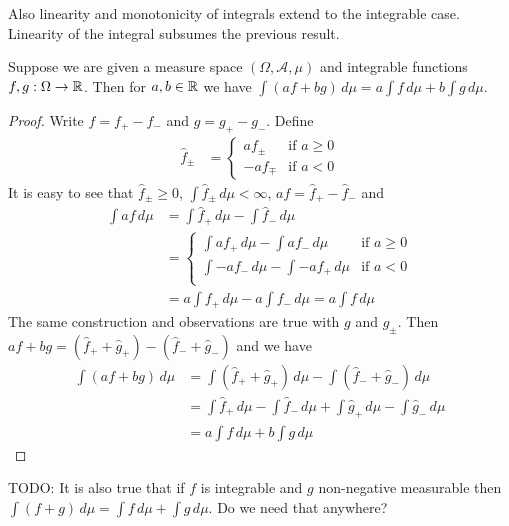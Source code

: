 Also linearity and monotonicity of integrals extend to the integrable
case.  Linearity of the integral subsumes the previous result.
\begin{lem}\label{SignedIntegralLinearity}Suppose we are given a measure space $(\Omega, \mathcal{A},
  \mu)$ and integrable functions $f,g: \Omega \to \mathbb{R}$.  Then for
  $a,b \in \mathbb{R}$ we have $\int (af + bg) \, d\mu = a\int f \, d\mu +
  b\int g \, d\mu$.
\end{lem}
\begin{proof}
Write $f = f_+ - f_-$ and $g = g_+ - g_-$.  Define 
\begin{align*}
\hat{f}_\pm &= \begin{cases}
a f_\pm & \text{if $a  \geq 0$} \\
-a f_\mp & \text{if $a < 0$}
\end{cases}
\end{align*} 
It is easy to see that $\hat{f}_\pm \geq 0$,
$\int \hat{f}_\pm \, d\mu < \infty$,  $a f = \hat{f}_+ - \hat{f}_-$
and
\begin{align*}
\int af \, d\mu &= \int \hat{f}_+ \, d\mu - \int \hat{f}_- \, d\mu\\
&= \begin{cases}
\int a f_+ \, d\mu - \int af_- \, d\mu & \text{if $a \geq 0$} \\
\int -a f_- \, d\mu - \int -af_+ \, d\mu & \text{if $a < 0$} \\
\end{cases}\\
&= a \int f_+ \, d\mu - a \int f_- \, d\mu = a \int f\, d\mu
\end{align*}  
The same construction and
observations are true with $g$ and $\hat{g}_\pm$.
Then $a f + b g = (\hat{f}_+ + \hat{g}_+) - (\hat{f}_- + \hat{g}_-)$
and we have
\begin{align*}
\int (a f + b g) \, d\mu &= \int (\hat{f}_+ + \hat{g}_+) \, d\mu -
\int (\hat{f}_- + \hat{g}_-) \, d\mu \\
&= \int \hat{f}_+ \, d\mu - \int \hat{f}_- \, d\mu + \int \hat{g}_+ \, d\mu -
\int \hat{g}_- \, d\mu \\
&= a \int f \, d\mu + b \int g \, d\mu
\end{align*}
\end{proof}

TODO: It is also true that if $f$ is integrable and $g$ non-negative measurable then $\int (f+g) \, d\mu = \int f \, d\mu + \int g \, d\mu$.  Do we need that anywhere?


